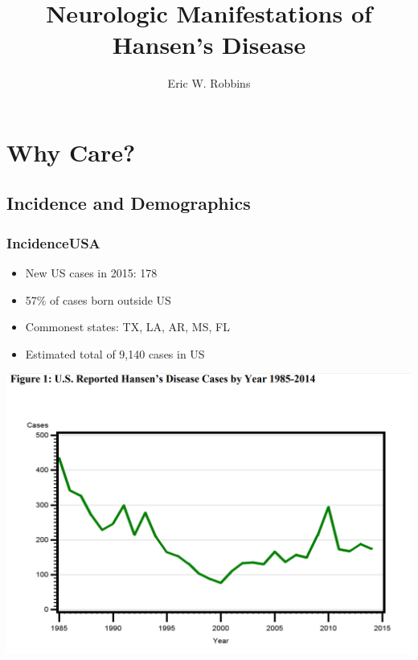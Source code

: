 \documentclass{beamer}
\title{Neurologic Manifestations of Hansen's Disease}
\author{Eric W. Robbins}
\date{}
\begin{document}
	\begin{frame}
		\maketitle
	\end{frame}
	\begin{frame}
		\tableofcontents
	\end{frame}
\section{Why Care?}
\subsection{Incidence and Demographics}
	\begin{frame}
		\frametitle{Incidence\textemdash USA}
			\begin{itemize}
				\item New US cases in 2015: 178
				\item 57\% of cases born outside US
				\item Commonest states: TX, LA, AR, MS, FL
				\item Estimated total of 9,140 cases in US
			\end{itemize}
	\end{frame}

	\begin{frame}
		\includegraphics[width=1.0\textwidth,keepaspectratio]{hansen-incidence-USA.png}
	\end{frame}
\end{document}
